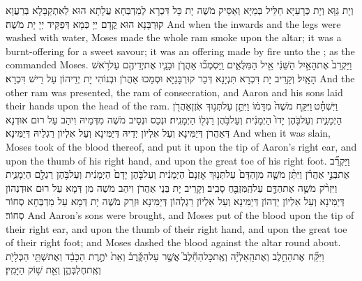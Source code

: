 {וְיָת גַּוָּא וְיָת כְּרָעַיָּא חַלֵּיל בְּמַיָּא וְאַסֵּיק מֹשֶׁה יָת כָּל דִּכְרָא לְמַדְבְּחָא עֲלָתָא הוּא לְאִתְקַבָּלָא בְּרַעֲוָא קוּרְבָּנָא הוּא קֳדָם יְיָ כְּמָא דְּפַקֵּיד יְיָ יָת מֹשֶׁה׃}
{And when the inwards and the legs were washed with water, Moses made the whole ram smoke upon the altar; it was a burnt-offering for a sweet savour; it was an offering made by fire unto the \lord; as the \lord\space commanded Moses.}{}
{וַיַּקְרֵב֙ אֶת\maqqaf הָאַ֣יִל הַשֵּׁנִ֔י אֵ֖יל הַמִּלֻּאִ֑ים וַֽיִּסְמְכ֞וּ אַהֲרֹ֧ן וּבָנָ֛יו אֶת\maqqaf יְדֵיהֶ֖ם עַל\maqqaf רֹ֥אשׁ הָאָֽיִל׃}
{וְקָרֵיב יָת דִּכְרָא תִּנְיָנָא דְּכַר קוּרְבָּנַיָּא וּסְמַכוּ אַהֲרֹן וּבְנוֹהִי יָת יְדֵיהוֹן עַל רֵישׁ דִּכְרָא׃}
{And the other ram was presented, the ram of consecration, and Aaron and his sons laid their hands upon the head of the ram.}{}
{וַיִּשְׁחָ֓ט \legarmeh  וַיִּקַּ֤ח מֹשֶׁה֙ מִדָּמ֔וֹ וַיִּתֵּ֛ן עַל\maqqaf תְּנ֥וּךְ אֹֽזֶן\maqqaf אַהֲרֹ֖ן הַיְמָנִ֑ית וְעַל\maqqaf בֹּ֤הֶן יָדוֹ֙ הַיְמָנִ֔ית וְעַל\maqqaf בֹּ֥הֶן רַגְל֖וֹ הַיְמָנִֽית׃}
{וּנְכַס וּנְסֵיב מֹשֶׁה מִדְּמֵיהּ וִיהַב עַל רוּם אוּדְנָא דְּאַהֲרֹן דְּיַמִּינָא וְעַל אִלְיוֹן יְדֵיהּ דְּיַמִּינָא וְעַל אִלְיוֹן רַגְלֵיהּ דְּיַמִּינָא׃}
{And when it was slain, Moses took of the blood thereof, and put it upon the tip of Aaron’s right ear, and upon the thumb of his right hand, and upon the great toe of his right foot.}{}
{וַיַּקְרֵ֞ב אֶת\maqqaf בְּנֵ֣י אַהֲרֹ֗ן וַיִּתֵּ֨ן מֹשֶׁ֤ה מִן\maqqaf הַדָּם֙ עַל\maqqaf תְּנ֤וּךְ אׇזְנָם֙ הַיְמָנִ֔ית וְעַל\maqqaf בֹּ֤הֶן יָדָם֙ הַיְמָנִ֔ית וְעַל\maqqaf בֹּ֥הֶן רַגְלָ֖ם הַיְמָנִ֑ית וַיִּזְרֹ֨ק מֹשֶׁ֧ה אֶת\maqqaf הַדָּ֛ם עַל\maqqaf הַֽמִּזְבֵּ֖חַ סָבִֽיב׃}
{וְקָרֵיב יָת בְּנֵי אַהֲרֹן וִיהַב מֹשֶׁה מִן דְּמָא עַל רוּם אוּדְנְהוֹן דְּיַמִּינָא וְעַל אִלְיוֹן יַדְהוֹן דְּיַמִּינָא וְעַל אִלְיוֹן רַגְלְהוֹן דְּיַמִּינָא וּזְרַק מֹשֶׁה יָת דְּמָא עַל מַדְבְּחָא סְחוֹר סְחוֹר׃}
{And Aaron’s sons were brought, and Moses put of the blood upon the tip of their right ear, and upon the thumb of their right hand, and upon the great toe of their right foot; and Moses dashed the blood against the altar round about.}{}
{וַיִּקַּ֞ח אֶת\maqqaf הַחֵ֣לֶב וְאֶת\maqqaf הָֽאַלְיָ֗ה וְאֶֽת\maqqaf כׇּל\maqqaf הַחֵ֘לֶב֮ אֲשֶׁ֣ר עַל\maqqaf הַקֶּ֒רֶב֒ וְאֵת֙ יֹתֶ֣רֶת הַכָּבֵ֔ד וְאֶת\maqqaf שְׁתֵּ֥י הַכְּלָיֹ֖ת וְאֶֽת\maqqaf חֶלְבְּהֶ֑ן וְאֵ֖ת שׁ֥וֹק הַיָּמִֽין׃}
